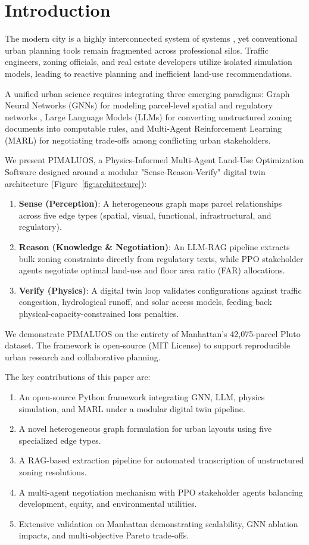 \documentclass[final,3p,times]{elsarticle}
\begin{document}
\section{Introduction}

The modern city is a highly interconnected system of systems \cite{batty2013new}, yet conventional urban planning tools remain fragmented across professional silos. Traffic engineers, zoning officials, and real estate developers utilize isolated simulation models, leading to reactive planning and inefficient land-use recommendations. 

A unified urban science requires integrating three emerging paradigms: Graph Neural Networks (GNNs) for modeling parcel-level spatial and regulatory networks \cite{jin2023spatio,zheng2023spatial}, Large Language Models (LLMs) for converting unstructured zoning documents into computable rules, and Multi-Agent Reinforcement Learning (MARL) for negotiating trade-offs among conflicting urban stakeholders.

We present PIMALUOS, a Physics-Informed Multi-Agent Land-Use Optimization Software designed around a modular "Sense-Reason-Verify" digital twin architecture (Figure~\ref{fig:architecture}):
\begin{enumerate}
    \item \textbf{Sense (Perception)}: A heterogeneous graph maps parcel relationships across five edge types (spatial, visual, functional, infrastructural, and regulatory).
    \item \textbf{Reason (Knowledge \& Negotiation)}: An LLM-RAG pipeline extracts bulk zoning constraints directly from regulatory texts, while PPO stakeholder agents negotiate optimal land-use and floor area ratio (FAR) allocations.
    \item \textbf{Verify (Physics)}: A digital twin loop validates configurations against traffic congestion, hydrological runoff, and solar access models, feeding back physical-capacity-constrained loss penalties.
\end{enumerate}

We demonstrate PIMALUOS on the entirety of Manhattan's 42,075-parcel Pluto dataset. The framework is open-source (MIT License) to support reproducible urban research and collaborative planning.

The key contributions of this paper are:
\begin{enumerate}
    \item An open-source Python framework integrating GNN, LLM, physics simulation, and MARL under a modular digital twin pipeline.
    \item A novel heterogeneous graph formulation for urban layouts using five specialized edge types.
    \item A RAG-based extraction pipeline for automated transcription of unstructured zoning resolutions.
    \item A multi-agent negotiation mechanism with PPO stakeholder agents balancing development, equity, and environmental utilities.
    \item Extensive validation on Manhattan demonstrating scalability, GNN ablation impacts, and multi-objective Pareto trade-offs.
\end{enumerate}
\end{document}
